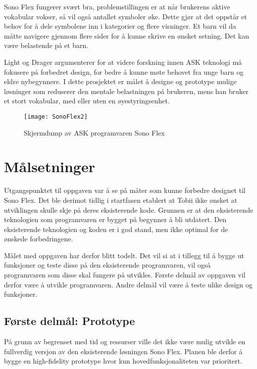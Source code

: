 Sono Flex fungerer svært bra, problemstillingen er at når brukerens aktive vokabular vokser, så vil også antallet symboler øke. Dette gjør at det oppstår et behov for å dele symbolene inn i kategorier og flere visninger. Et barn vil da måtte navigere gjennom flere sider for å kunne skrive en ønsket setning. Det kan være belastende på et barn.

Light og Drager \cite{aac} argumenterer for at videre forskning innen ASK teknologi må fokusere på forbedret design, for bedre å kunne møte behovet fra unge barn og eldre nybegynnere. I dette prosjektet er målet å designe og prototype mulige løsninger som reduserer den mentale belastningen på brukeren, mens han bruker et stort vokabular, med eller uten en øyestyringsenhet. 

\begin{figure}[ht!]
\centering
\texttt{[image: SonoFlex2]}
\caption{Skjermdump av ASK programvaren Sono Flex}
\label{fig:SonoFlex}
\end{figure}


\section{Målsetninger}

Utgangspunktet til oppgaven var å se på måter som kunne forbedre designet til Sono Flex. Det ble derimot tidlig i startfasen etablert at Tobii ikke ønsket at utviklingen skulle skje på deres eksisterende kode. Grunnen er at den eksisterende teknologien som programvaren er bygget på begynner å bli utdatert. Den eksisterende teknologien og koden er i god stand, men ikke optimal for de ønskede forbedringene. 

Målet med oppgaven har derfor blitt todelt. Det vil si at i tillegg til å bygge ut funksjoner og teste disse på den eksisterende programvaren, vil også programvaren som disse skal fungere på utvikles. Første delmål av oppgaven vil derfor være å utvikle programvaren. Andre delmål vil være å teste ulike design og funksjoner.

\subsection{Første delmål: Prototype}

På grunn av begrenset med tid og ressurser ville det ikke være mulig  utvikle en fullverdig versjon av den eksisterende løsningen Sono Flex. Planen ble derfor å bygge en high-fidelity prototype hvor kun hovedfunksjonaliteten var prioritert.  

